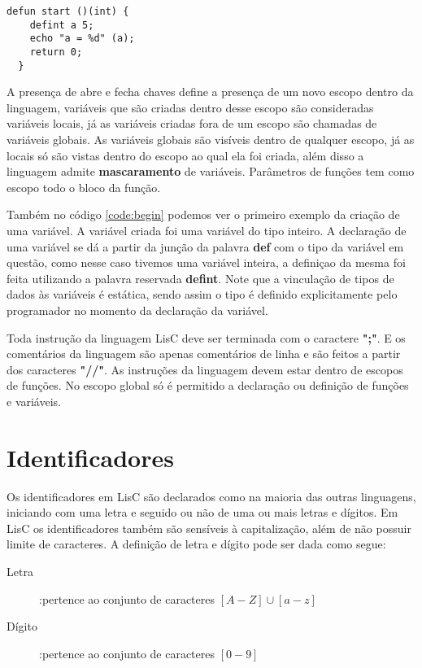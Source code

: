 \documentclass[
  12pt,				%
  oneside,			%
  a4paper,			%
  english,			%
  french,				%
  spanish,			%
  brazil,				%
]{abntex2}
\begin{document}
\begin{lstlisting}[label={code:begin},caption=Código
    exemplo de uma função begin.]
  defun start ()(int) {
    defint a 5;
    echo "a = %d" (a);
    return 0;
  }
\end{lstlisting}

A presença de abre e fecha chaves define a presença de um
novo escopo dentro da linguagem, variáveis que são criadas dentro
desse escopo são consideradas variáveis locais, já as variáveis
criadas fora de um escopo são chamadas de variáveis globais. As
variáveis globais são visíveis dentro de qualquer escopo, já as locais
só são vistas dentro do escopo ao qual ela foi criada, além disso a
linguagem admite \textbf{mascaramento} de variáveis. Parâmetros de
funções tem como escopo todo o bloco da função.

Também no código \ref{code:begin} podemos ver o primeiro exemplo
da criação de uma variável. A variável criada foi uma variável do
tipo inteiro. A declaração de uma variável se dá a partir da junção da
palavra \textbf{def} com o tipo da variável em questão, como nesse
caso
tivemos uma variável inteira, a definiçao da mesma foi feita
utilizando
a palavra reservada \textbf{defint}. Note que a vinculação de tipos de
dados às variáveis é estática, sendo assim o tipo é definido
explicitamente pelo programador no momento da declaração da variável.

Toda instrução da linguagem LisC deve ser terminada com o caractere
\textbf{";"}. E os comentários da linguagem são apenas comentários de
linha e são feitos a partir dos caracteres \textbf{"//"}. As
instruções da linguagem devem estar dentro de escopos de funções. No
escopo global só é permitido a declaração ou definição de funções e
variáveis.

\chapter{Identificadores}
\label{cha:identificadores}
Os identificadores em LisC são declarados como na maioria das outras linguagens,
iniciando com uma letra e seguido ou não de uma ou mais letras e
dígitos. Em LisC os identificadores também são sensíveis à capitalização, além
de não possuir limite de caracteres. A definição de letra e dígito
pode ser dada como segue:

\begin{description}
\item [Letra]:pertence ao conjunto de caracteres $[A-Z]\cup[a-z]$
\item [Dígito]:pertence ao conjunto de caracteres $[0-9]$
\end{description}
\end{document}
